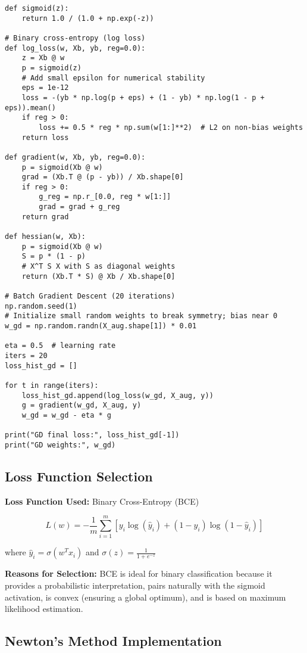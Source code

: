 \documentclass[12pt]{article}
\begin{document}
\begin{lstlisting}[caption={Batch Gradient Descent implementation}]
def sigmoid(z):
    return 1.0 / (1.0 + np.exp(-z))

# Binary cross-entropy (log loss)
def log_loss(w, Xb, yb, reg=0.0):
    z = Xb @ w
    p = sigmoid(z)
    # Add small epsilon for numerical stability
    eps = 1e-12
    loss = -(yb * np.log(p + eps) + (1 - yb) * np.log(1 - p + eps)).mean()
    if reg > 0:
        loss += 0.5 * reg * np.sum(w[1:]**2)  # L2 on non-bias weights
    return loss

def gradient(w, Xb, yb, reg=0.0):
    p = sigmoid(Xb @ w)
    grad = (Xb.T @ (p - yb)) / Xb.shape[0]
    if reg > 0:
        g_reg = np.r_[0.0, reg * w[1:]]
        grad = grad + g_reg
    return grad

def hessian(w, Xb):
    p = sigmoid(Xb @ w)
    S = p * (1 - p)
    # X^T S X with S as diagonal weights
    return (Xb.T * S) @ Xb / Xb.shape[0]

# Batch Gradient Descent (20 iterations)
np.random.seed(1)
# Initialize small random weights to break symmetry; bias near 0
w_gd = np.random.randn(X_aug.shape[1]) * 0.01

eta = 0.5  # learning rate
iters = 20
loss_hist_gd = []

for t in range(iters):
    loss_hist_gd.append(log_loss(w_gd, X_aug, y))
    g = gradient(w_gd, X_aug, y)
    w_gd = w_gd - eta * g

print("GD final loss:", loss_hist_gd[-1])
print("GD weights:", w_gd)
\end{lstlisting}

\subsection{Loss Function Selection}

\textbf{Loss Function Used:} Binary Cross-Entropy (BCE)

$$L(w) = -\frac{1}{m}\sum_{i=1}^{m}[y_i \log(\hat{y}_i) + (1-y_i)\log(1-\hat{y}_i)]$$

where $\hat{y}_i = \sigma(w^T x_i)$ and $\sigma(z) = \frac{1}{1+e^{-z}}$

\textbf{Reasons for Selection:} BCE is ideal for binary classification because it provides a probabilistic interpretation, pairs naturally with the sigmoid activation, is convex (ensuring a global optimum), and is based on maximum likelihood estimation.


\subsection{Newton's Method Implementation}
\end{document}
